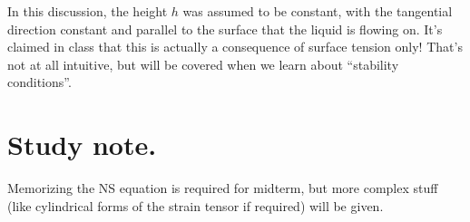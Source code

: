 In this discussion, the height $h$ was assumed to be constant, with the tangential direction constant and parallel to the surface that the liquid is flowing on.  It's claimed in class that this is actually a consequence of surface tension only!  That's not at all intuitive, but will be covered when we learn about ``stability conditions''.

\section{Study note.}

Memorizing the NS equation is required for midterm, but more complex stuff (like cylindrical forms of the strain tensor if required) will be given.

\EndArticle
